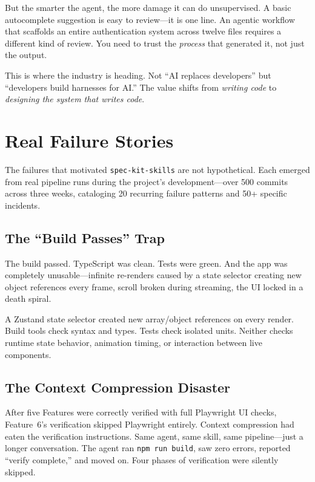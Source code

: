 \documentclass[11pt,a4paper,openright,twoside]{report}
\newcommand{\speckit}{\texttt{spec-kit-skills}}
\begin{document}
But the smarter the agent, the more damage it can do unsupervised. A basic autocomplete suggestion is easy to review---it is one line. An agentic workflow that scaffolds an entire authentication system across twelve files requires a different kind of review. You need to trust the \emph{process} that generated it, not just the output.

This is where the industry is heading. Not ``AI replaces developers'' but ``developers build harnesses for AI.'' The value shifts from \emph{writing code} to \emph{designing the system that writes code}.

\section{Real Failure Stories}

The failures that motivated \speckit{} are not hypothetical. Each emerged from real pipeline runs during the project's development---over 500 commits across three weeks, cataloging 20 recurring failure patterns and 50+ specific incidents.

\subsection{The ``Build Passes'' Trap}

The build passed. TypeScript was clean. Tests were green. And the app was completely unusable---infinite re-renders caused by a state selector creating new object references every frame, scroll broken during streaming, the UI locked in a death spiral.

A Zustand state selector created new array/object references on every render. Build tools check syntax and types. Tests check isolated units. Neither checks runtime state behavior, animation timing, or interaction between live components.

\subsection{The Context Compression Disaster}

After five Features were correctly verified with full Playwright UI checks, Feature~6's verification skipped Playwright entirely. Context compression had eaten the verification instructions. Same agent, same skill, same pipeline---just a longer conversation. The agent ran \texttt{npm run build}, saw zero errors, reported ``verify complete,'' and moved on. Four phases of verification were silently skipped.
\end{document}
